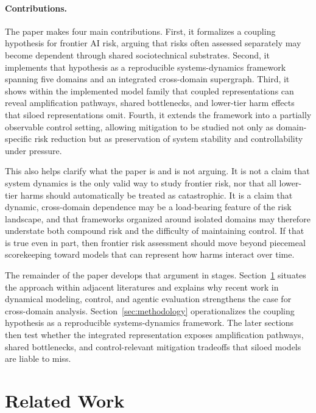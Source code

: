 \documentclass[11pt]{article}
\begin{document}
\paragraph{Contributions.}
The paper makes four main contributions. First, it formalizes a coupling hypothesis for frontier AI risk, arguing that risks often assessed separately may become dependent through shared sociotechnical substrates. Second, it implements that hypothesis as a reproducible systems-dynamics framework spanning five domains and an integrated cross-domain supergraph. Third, it shows within the implemented model family that coupled representations can reveal amplification pathways, shared bottlenecks, and lower-tier harm effects that siloed representations omit. Fourth, it extends the framework into a partially observable control setting, allowing mitigation to be studied not only as domain-specific risk reduction but as preservation of system stability and controllability under pressure.

This also helps clarify what the paper is and is not arguing. It is not a claim that system dynamics is the only valid way to study frontier risk, nor that all lower-tier harms should automatically be treated as catastrophic. It is a claim that dynamic, cross-domain dependence may be a load-bearing feature of the risk landscape, and that frameworks organized around isolated domains may therefore understate both compound risk and the difficulty of maintaining control. If that is true even in part, then frontier risk assessment should move beyond piecemeal scorekeeping toward models that can represent how harms interact over time.

The remainder of the paper develops that argument in stages. Section~\ref{sec:related} situates the approach within adjacent literatures and explains why recent work in dynamical modeling, control, and agentic evaluation strengthens the case for cross-domain analysis. Section~\ref{sec:methodology} operationalizes the coupling hypothesis as a reproducible systems-dynamics framework. The later sections then test whether the integrated representation exposes amplification pathways, shared bottlenecks, and control-relevant mitigation tradeoffs that siloed models are liable to miss.
\section{Related Work}
\label{sec:related}
\end{document}

